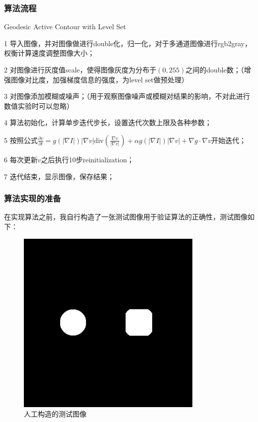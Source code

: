 \documentclass[a4paper, UTF8]{ctexrep}
\begin{document}
		\subsubsection{算法流程} %
		\label{ssub:算法流程}
			\begin{algorithm}
				\caption{Geodesic Active Contour with Level Set}
				\begin{algorithmic}
					\item[1] 导入图像，并对图像做进行double化，归一化，对于多通道图像进行rgb2gray，权衡计算速度调整图像大小；
					\item[2] 对图像进行灰度值scale，使得图像灰度为分布于$\left(0, 255\right)$之间的double数；（增强图像对比度，加强梯度信息的强度，为level set做预处理）	
					\item[3] 对图像添加模糊或噪声；（用于观察图像噪声或模糊对结果的影响，不对此进行数值实验时可以忽略）
					\item[4] 算法初始化，计算单步迭代步长，设置迭代次数上限及各种参数；
					\item[5] 按照公式$\frac{\partial v}{\partial t} = g\left(|\nabla I|\right)|\nabla v|\mathrm{div} \left(\frac{\nabla v}{|\nabla v|}\right) + \alpha g \left( |\nabla I| \right) |\nabla v| + \nabla g \cdot \nabla v$开始迭代；
					\item[6] 每次更新$v$之后执行10步reinitialization；
					\item[7] 迭代结束，显示图像，保存结果；
				\end{algorithmic}
			\end{algorithm}
		
		\subsubsection{算法实现的准备} %
			在实现算法之前，我自行构造了一张测试图像用于验证算法的正确性，测试图像如下：\clearpage
			\begin{figure}[htbp!]
				\centering
				\includegraphics[width=0.8\textwidth]{hw3_fig1.jpg}
				\caption{人工构造的测试图像}
				\label{fig:figure1}
			\end{figure}
		
\end{document}
